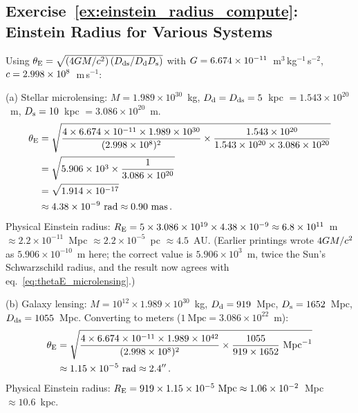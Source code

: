 \subsection*{Exercise~\ref{ex:einstein_radius_compute}: Einstein Radius for Various Systems}

Using $\theta_{\mathrm{E}} = \sqrt{(4G M/c^2)\,(D_{\mathrm{ds}}/D_{\mathrm{d}}D_{\mathrm{s}})}$
with $G = 6.674 \times 10^{-11}$~m$^3$\,kg$^{-1}$\,s$^{-2}$,
$c = 2.998 \times 10^{8}$~m\,s$^{-1}$:

\medskip
\noindent(a) Stellar microlensing:
$M = 1.989 \times 10^{30}$~kg, $D_{\mathrm{d}} = D_{\mathrm{ds}} = 5$~kpc $= 1.543 \times 10^{20}$~m,
$D_{\mathrm{s}} = 10$~kpc $= 3.086 \times 10^{20}$~m.
\begin{align*}
    \theta_{\mathrm{E}} &= \sqrt{\frac{4 \times 6.674 \times 10^{-11} \times
    1.989 \times 10^{30}}{(2.998 \times 10^8)^2} \times
    \frac{1.543 \times 10^{20}}{1.543 \times 10^{20} \times
    3.086 \times 10^{20}}} \\
    &= \sqrt{5.906 \times 10^{3} \times
    \frac{1}{3.086 \times 10^{20}}} \\
    &= \sqrt{1.914 \times 10^{-17}} \\
    &\approx 4.38 \times 10^{-9}~\text{rad}
    \approx 0.90~\text{mas} \,.
\end{align*}
Physical Einstein radius: $R_{\mathrm{E}} = 5 \times 3.086 \times 10^{19} \times
4.38 \times 10^{-9} \approx 6.8 \times 10^{11}$~m
$\approx 2.2 \times 10^{-11}$~Mpc $\approx 2.2 \times 10^{-5}$~pc $\approx 4.5$~AU.
(Earlier printings wrote $4G M/c^2$ as $5.906\times10^{-10}$~m
here; the correct value is $5.906\times10^{3}$~m, twice the Sun's Schwarzschild
radius, and the result now agrees with eq.~\eqref{eq:thetaE_microlensing}.)

\medskip
\noindent(b) Galaxy lensing:
$M = 10^{12} \times 1.989 \times 10^{30}$~kg, $D_{\mathrm{d}} = 919$~Mpc,
$D_{\mathrm{s}} = 1652$~Mpc, $D_{\mathrm{ds}} = 1055$~Mpc.
Converting to meters ($1~\text{Mpc} = 3.086 \times 10^{22}$~m):
\begin{align*}
    \theta_{\mathrm{E}} &= \sqrt{\frac{4 \times 6.674 \times 10^{-11} \times
    1.989 \times 10^{42}}{(2.998 \times 10^8)^2} \times
    \frac{1055}{919 \times 1652}~\text{Mpc}^{-1}} \\
    &\approx 1.15 \times 10^{-5}~\text{rad} \approx 2.4'' \,.
\end{align*}
Physical Einstein radius: $R_{\mathrm{E}} = 919 \times 1.15 \times 10^{-5}~\text{Mpc}
\approx 1.06 \times 10^{-2}$~Mpc $\approx 10.6$~kpc.


